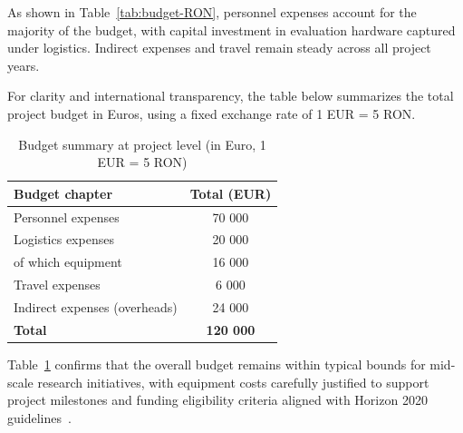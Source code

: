 \vspace{0.5\baselineskip}

As shown in Table~\ref{tab:budget-RON}, personnel expenses account for the majority of the budget, with capital investment in evaluation hardware captured under logistics. Indirect expenses and travel remain steady across all project years.

For clarity and international transparency, the table below summarizes the total project budget in Euros, using a fixed exchange rate of 1 EUR = 5 RON.

\vspace{0.5\baselineskip}

\begin{table}[H]
  \centering
  \begin{tabular}{p{5cm} c}
    \hline
    \textbf{Budget chapter} & \textbf{Total (EUR)} \\
    \hline
    Personnel expenses            &  70 000 \\
    Logistics expenses            &  20 000 \\
    \quad of which equipment      &  16 000 \\
    Travel expenses               &   6 000 \\
    Indirect expenses (overheads) &  24 000 \\
    \hline
    \textbf{Total}                & \textbf{120 000} \\
    \hline
  \end{tabular}
  \caption{Budget summary at project level (in Euro, 1 EUR = 5 RON)}
  \label{tab:budget-eur}
\end{table}

\vspace{0.5\baselineskip}

Table~\ref{tab:budget-eur} confirms that the overall budget remains within typical bounds for mid-scale research initiatives, with equipment costs carefully justified to support project milestones and funding eligibility criteria aligned with Horizon 2020 guidelines~\cite{ec_amga2020}.
